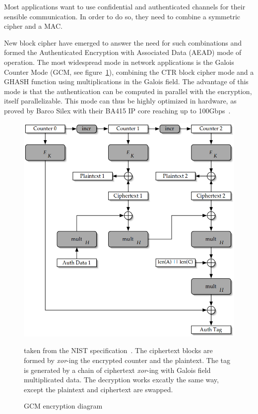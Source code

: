 Most applications want to use confidential and authenticated channels for their sensible communication.
In order to do so, they need to combine a symmetric cipher and a MAC.

\noindent New block cipher have emerged to answer the need for such combinations and formed the Authenticated Encryption with Associated Data (AEAD) mode of operation.
The most widespread mode in network applications is the Galois Counter Mode (GCM, see figure~\ref{fig:gcm-encrypt}), combining the CTR block cipher mode and a GHASH function using multiplications in the Galois field.
The advantage of this mode is that the authentication can be computed in parallel with the encryption, itself parallelizable.
This mode can thus be highly optimized in hardware, as proved by Barco Silex with their BA415 IP core reaching up to 100Gbps~\cite{barco-ba415}.

\begin{figure}
\includegraphics[width=\textwidth]{nist-gcm-encrypt}
\caption{GCM encryption diagram}{taken from the NIST specification~\cite{mcgrew2005}. The ciphertext blocks are formed by \textit{xor}-ing the encrypted counter and the plaintext. The tag is generated by a chain of ciphertext \textit{xor}-ing with Galois field multiplicated data. The decryption works excatly the same way, except the plaintext and ciphertext are swapped.}
\label{fig:gcm-encrypt}
\end{figure}









